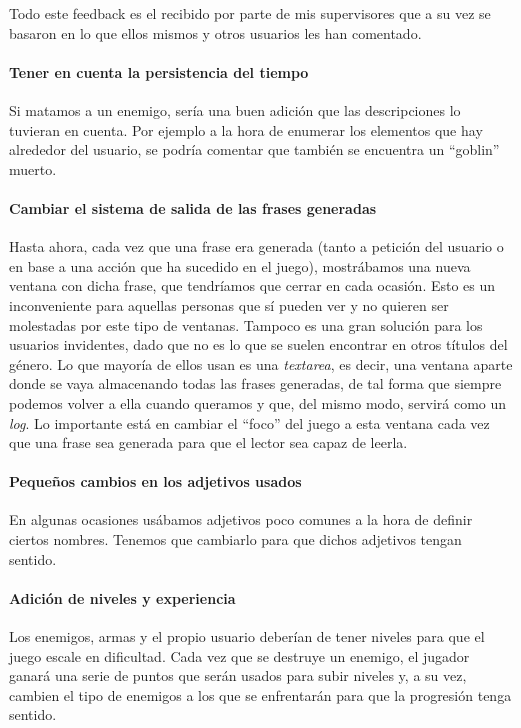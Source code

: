 Todo este feedback es el recibido por parte de mis supervisores que a su vez se basaron en lo que ellos mismos y otros usuarios les han comentado.

\paragraph{Tener en cuenta la persistencia del tiempo} Si matamos a un enemigo, sería una buen adición que las descripciones lo tuvieran en cuenta. Por ejemplo a la hora de enumerar los elementos que hay alrededor del usuario, se podría comentar que también se encuentra un ``goblin'' muerto.

\paragraph{Cambiar el sistema de salida de las frases generadas} Hasta ahora, cada vez que una frase era generada (tanto a petición del usuario o en base a una acción que ha sucedido en el juego), mostrábamos una nueva ventana con dicha frase, que tendríamos que cerrar en cada ocasión. Esto es un inconveniente para aquellas personas que sí pueden ver y no quieren ser molestadas por este tipo de ventanas. Tampoco es una gran solución para los usuarios invidentes, dado que no es lo que se suelen encontrar en otros títulos del género. Lo que mayoría de ellos usan es una \textit{textarea}, es decir, una ventana aparte donde se vaya almacenando todas las frases generadas, de tal forma que siempre podemos volver a ella cuando queramos y que, del mismo modo, servirá como un \textit{log}. Lo importante está en cambiar el ``foco'' del juego a esta ventana cada vez que una frase sea generada para que el lector sea capaz de leerla.

\paragraph{Pequeños cambios en los adjetivos usados} En algunas ocasiones usábamos adjetivos poco comunes a la hora de definir ciertos nombres. Tenemos que cambiarlo para que dichos adjetivos tengan sentido.

\paragraph{Adición de niveles y experiencia} Los enemigos, armas y el propio usuario deberían de tener niveles para que el juego escale en dificultad. Cada vez que se destruye un enemigo, el jugador ganará una serie de puntos que serán usados para subir niveles y, a su vez, cambien el tipo de enemigos a los que se enfrentarán para que la progresión tenga sentido.

